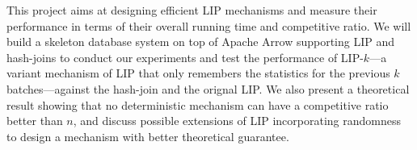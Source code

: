This project aims at designing efficient LIP mechanisms and measure their performance in terms of their overall running time and competitive ratio. We will build a skeleton database system on top of Apache Arrow supporting LIP and hash-joins to conduct our experiments and test the performance of LIP-$k$---a variant mechanism of LIP that only remembers the statistics for the previous $k$ batches---against the hash-join and the orignal LIP. We also present a theoretical result showing that no deterministic mechanism can have a competitive ratio better than $n$, and discuss possible extensions of LIP incorporating randomness to design a mechanism with better theoretical guarantee. 




